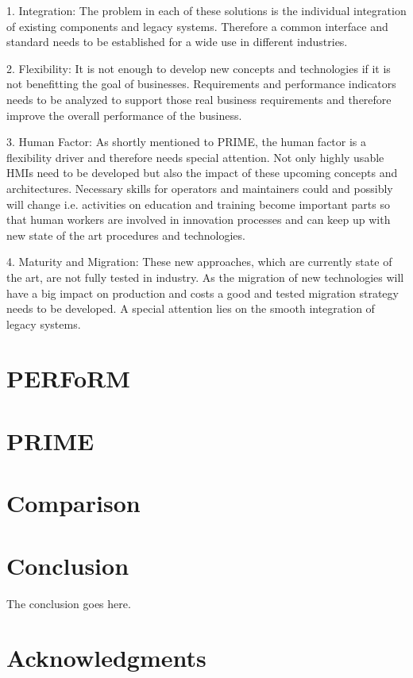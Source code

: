 \documentclass[conference,compsoc]{IEEEtran}
\begin{document}
1. Integration: The problem in each of these solutions is the individual integration of existing components and legacy systems. Therefore a common interface and standard needs to be established for a wide use in different industries.

2. Flexibility: It is not enough to develop new concepts and technologies if it is not benefitting the goal of businesses. Requirements and performance indicators needs to be analyzed to support those real business requirements and therefore improve the overall performance of the business.

3. Human Factor:  As shortly mentioned to PRIME, the human factor is a flexibility driver and therefore needs special attention. Not only highly usable HMIs need to be developed but also the impact of these upcoming concepts and architectures. Necessary skills for operators and maintainers could and possibly will change i.e. activities on education and training become important parts so that human workers are involved in innovation processes and can keep up with new state of the art procedures and technologies.

4. Maturity and Migration: These new approaches, which are currently state of the art, are not fully tested in industry. As the migration of new technologies will have a big impact on production and costs a good and tested migration strategy needs to be developed. A special attention lies on the smooth integration of legacy systems.

\section{PERFoRM} %
\section{PRIME} %
\section{Comparison} %
\section{Conclusion} %
The conclusion goes here.

\ifCLASSOPTIONcompsoc
  \section*{Acknowledgments}
\else
\end{document}
